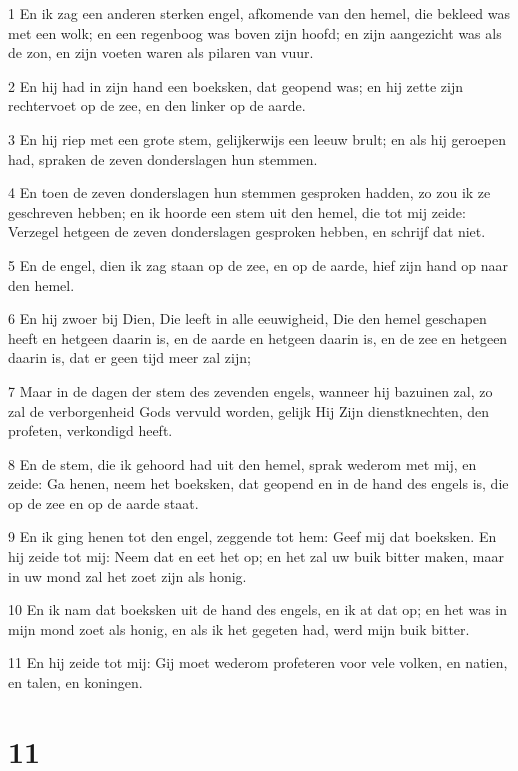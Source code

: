 \par 1 En ik zag een anderen sterken engel, afkomende van den hemel, die bekleed was met een wolk; en een regenboog was boven zijn hoofd; en zijn aangezicht was als de zon, en zijn voeten waren als pilaren van vuur.
\par 2 En hij had in zijn hand een boeksken, dat geopend was; en hij zette zijn rechtervoet op de zee, en den linker op de aarde.
\par 3 En hij riep met een grote stem, gelijkerwijs een leeuw brult; en als hij geroepen had, spraken de zeven donderslagen hun stemmen.
\par 4 En toen de zeven donderslagen hun stemmen gesproken hadden, zo zou ik ze geschreven hebben; en ik hoorde een stem uit den hemel, die tot mij zeide: Verzegel hetgeen de zeven donderslagen gesproken hebben, en schrijf dat niet.
\par 5 En de engel, dien ik zag staan op de zee, en op de aarde, hief zijn hand op naar den hemel.
\par 6 En hij zwoer bij Dien, Die leeft in alle eeuwigheid, Die den hemel geschapen heeft en hetgeen daarin is, en de aarde en hetgeen daarin is, en de zee en hetgeen daarin is, dat er geen tijd meer zal zijn;
\par 7 Maar in de dagen der stem des zevenden engels, wanneer hij bazuinen zal, zo zal de verborgenheid Gods vervuld worden, gelijk Hij Zijn dienstknechten, den profeten, verkondigd heeft.
\par 8 En de stem, die ik gehoord had uit den hemel, sprak wederom met mij, en zeide: Ga henen, neem het boeksken, dat geopend en in de hand des engels is, die op de zee en op de aarde staat.
\par 9 En ik ging henen tot den engel, zeggende tot hem: Geef mij dat boeksken. En hij zeide tot mij: Neem dat en eet het op; en het zal uw buik bitter maken, maar in uw mond zal het zoet zijn als honig.
\par 10 En ik nam dat boeksken uit de hand des engels, en ik at dat op; en het was in mijn mond zoet als honig, en als ik het gegeten had, werd mijn buik bitter.
\par 11 En hij zeide tot mij: Gij moet wederom profeteren voor vele volken, en natien, en talen, en koningen.

\chapter{11}

